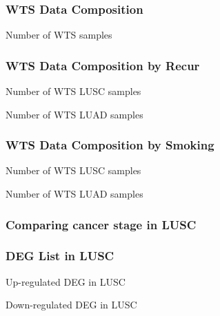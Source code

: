 \documentclass{beamer}
\begin{document}
    \begin{frame}
        \frametitle{WTS Data Composition}

        \begin{table}
            \caption{Number of WTS samples}
            
        \end{table}
    \end{frame}

    \begin{frame}[allowframebreaks]
        \frametitle{WTS Data Composition by Recur}

        \begin{table}
            \caption{Number of WTS LUSC samples}
            
        \end{table}

        \begin{table}
            \caption{Number of WTS LUAD samples}
            
        \end{table}
    \end{frame}

    \begin{frame}[allowframebreaks]
        \frametitle{WTS Data Composition by Smoking}

        \begin{table}
            \caption{Number of WTS LUSC samples}
            
        \end{table}

        \begin{table}
            \caption{Number of WTS LUAD samples}
            
        \end{table}
    \end{frame}

    \subsubsection{Comparing cancer stage in LUSC}
    \begin{frame}
        \frametitle{DEG List in LUSC}

        \begin{table}
            \caption{Up-regulated DEG in LUSC}
            
        \end{table}

        \begin{table}
            \caption{Down-regulated DEG in LUSC}
            
        \end{table}
    \end{frame}
\end{document}
